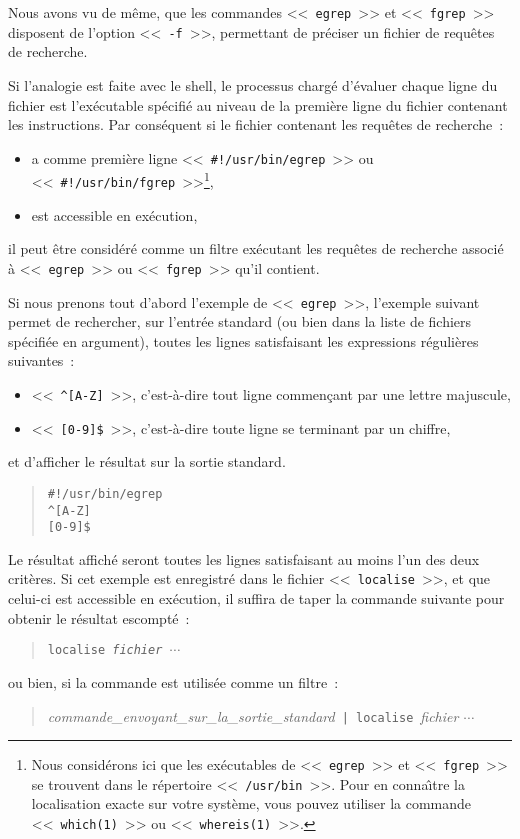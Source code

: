 Nous avons vu de m{\^e}me, que les commandes <<~{\tt egrep}~>> et <<~{\tt fgrep}~>> disposent de l'option <<~{\tt -f}~>>, permettant de pr{\'e}ciser un fichier de requ{\^e}tes de recherche.

Si l'analogie est faite avec le shell, le processus charg{\'e} d'{\'e}valuer chaque ligne du fichier est l'ex{\'e}cutable sp{\'e}cifi{\'e} au niveau de la premi{\`e}re ligne du fichier contenant les instructions. Par cons{\'e}quent si le fichier contenant les requ{\^e}tes de recherche~:
\begin{itemize}
	\item	a comme premi{\`e}re ligne <<~\verb=#!/usr/bin/egrep=~>> ou
			<<~\verb=#!/usr/bin/fgrep=~>>\footnote{Nous
			consid{\'e}rons ici que les ex{\'e}cutables de <<~{\tt egrep}~>> et
			<<~{\tt fgrep}~>> se trouvent dans
			le r{\'e}pertoire <<~{\tt /usr/bin}~>>. Pour en conna{\^\i}tre la
			localisation exacte sur votre syst{\`e}me, vous pouvez utiliser
			la commande <<~{\tt which(1)}~>> ou <<~{\tt whereis(1)}~>>.},
	\item	est accessible en ex{\'e}cution,
\end{itemize}
il peut {\^e}tre consid{\'e}r{\'e} comme un filtre ex{\'e}cutant les requ{\^e}tes de recherche associ{\'e} {\`a} <<~{\tt egrep}~>> ou <<~{\tt fgrep}~>> qu'il contient.

Si nous prenons tout d'abord l'exemple de <<~{\tt egrep}~>>, l'exemple suivant
permet de rechercher, sur l'entr{\'e}e standard (ou bien dans la liste de fichiers sp{\'e}cifi{\'e}e en argument), toutes les lignes satisfaisant les expressions r{\'e}guli{\`e}res suivantes~:
\begin{itemize}
	\item	<<~\verb=^[A-Z]=~>>, c'est-{\`a}-dire tout ligne commen\c{c}ant par une lettre majuscule,
	\item	<<~\verb=[0-9]$=~>>, c'est-{\`a}-dire toute ligne se terminant par un chiffre,
\end{itemize}
et d'afficher le r{\'e}sultat sur la sortie standard.
\begin{quote}
\begin{verbatim}
#!/usr/bin/egrep
^[A-Z]
[0-9]$
\end{verbatim}
\end{quote}

Le r{\'e}sultat affich{\'e} seront toutes les lignes satisfaisant au moins l'un des deux crit{\`e}res. Si cet exemple est enregistr{\'e} dans le fichier <<~{\tt localise}~>>, et que celui-ci est accessible en ex{\'e}cution, il suffira de taper la commande suivante pour obtenir le r{\'e}sultat escompt{\'e}~:
\begin{quote}
{\tt localise~{\sl fichier $\cdots$}}
\end{quote}
ou bien, si la commande est utilis{\'e}e comme un filtre~:
\begin{quote}
{\sl commande\_envoyant\_sur\_la\_sortie\_standard}~\verb=| localise=~{\sl fichier $\cdots$}
\end{quote}

